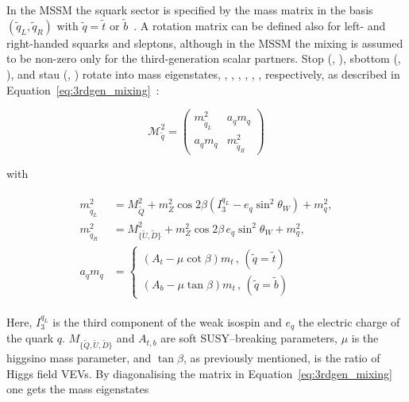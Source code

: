 				In the \ac{MSSM} the squark sector is specified by the mass matrix in the basis $(\tilde{q}_L, \tilde{q}_R)$ with $\tilde{q} = \tilde{t}$ or $\tilde{b}$~\cite{Haber:1984rc}. A rotation matrix can be defined also for left- and right-handed squarks and sleptons, although in the \ac{MSSM} the mixing is assumed to be non-zero only for the third-generation scalar partners. Stop (\stopL, \stopR), sbottom (\sbottomL, \sbottomR), and stau (\stauL, \stauR) rotate into mass eigenstates, \stopone, \stoptwo, \sbottomone, \sbottomtwo, \stauone, \stautwo, respectively, as described in Equation~\ref{eq:3rdgen_mixing}~\cite{Hidaka:2000cm}: %

				\begin{equation}
				\label{eq:3rdgen_mixing}
					\mathcal {M}_{\tilde{q}}^2 = 
					\begin{pmatrix}
						m_{\tilde{q}_L}^2 & a_q m_q \\
						a_q m_q & m_{\tilde{q}_R}^2
					\end{pmatrix}
				\end{equation}

				\noindent with 

				\begin{align}
				\label{eq:msqL}
					\begin{split}
						m_{\tilde{q}_L}^2 & = M_{\tilde{Q}}^2 + m_Z^2 \cos 2\beta \left ( I_3^{q_L} - e_q \sin^2 \theta_W \right ) + m_q^2 ,
						\\ 
						m_{\tilde{q}_R}^2 & = M_{{\{ \tilde{U},\tilde{D} \}}}^2 + m_Z^2 \cos 2\beta\, e_q \sin^2 \theta_W  + m_q^2 , 
						\\
						a_q m_q & = 
						\begin{cases}
							\left ( A_t - \mu \cot \beta \right ) m_t\, , \, (\tilde{q} = \tilde{t}) \\  
							\left ( A_b - \mu \tan \beta \right ) m_t\, , \, (\tilde{q} = \tilde{b})  
						\end{cases}
					\end{split}
				\end{align}

				\noindent Here, $I_3^{q_L}$ is the third component of the weak isospin and $e_q$ the electric charge of the quark $q$. $M_{{\{ \tilde{Q},\tilde{U},\tilde{D} \}}}$ and $A_{t,b}$ are soft \ac{SUSY}–breaking parameters, $\mu$ is the higgsino mass parameter, and $\tan \beta$, as previously mentioned, is the ratio of Higgs field \ac{VEV}s. By diagonalising the matrix in Equation~\ref{eq:3rdgen_mixing} one gets the mass eigenstates 
				
